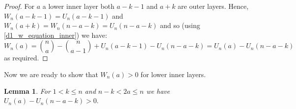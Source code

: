 \documentclass[11pt, reqno]{amsart}
\newcommand{\leanblueprintbase}{https://mj141592.github.io/weighted-chains-paper}
\newif\ifleanlinks
\newcommand{\leanblueprint}[1]{%
  \ifleanlinks
    \leavevmode\unskip\penalty9999\hbox{}\nobreak\hfill\quad
    \href{\leanblueprintbase/theorems/#1/}{%
      \mbox{\normalfont\footnotesize\textcolor{blue}{[\textsf{Lean formalisation}]}}}%
    \par\nobreak
  \fi
}
\newtheorem{lemma}[theorem]{Lemma}
\theoremstyle{remark}
\numberwithin{equation}{section}
\newcommand{\wn}{W_{n}}
\newcommand{\un}{U_{n}}
\begin{document}
\begin{proof}
    For $a$ a lower inner layer both $a-k-1$ and $a+k$ are outer layers. Hence, $\wn(a-k-1)=\un(a-k-1)$ and $\wn(a+k)=\wn(n-a-k)=\un(n-a-k)$ and so (using \ref{d1_w_equation_inner}) we have:
    \begin{equation*}
        \wn(a) = \binom{n}{a} - \binom{n}{a-1} + \un(a-k-1) - \un(n-a-k) = \un(a) - \un(n-a-k)
    \end{equation*}
    as required.
\end{proof}

Now we are ready to show that $W_n(a)>0$ for lower inner layers.

\begin{lemma}
\label{wc:lem:boolean-inner-weight-positive}
\label{d1_lower_inner_positive}
    For $1 < k \leqslant n$ and $n-k < 2a \leqslant n$ we have $U_n(a) - U_n(n-a-k) > 0.$
\leanblueprint{boolean-inner-weight-positive}
\end{lemma}
\end{document}
